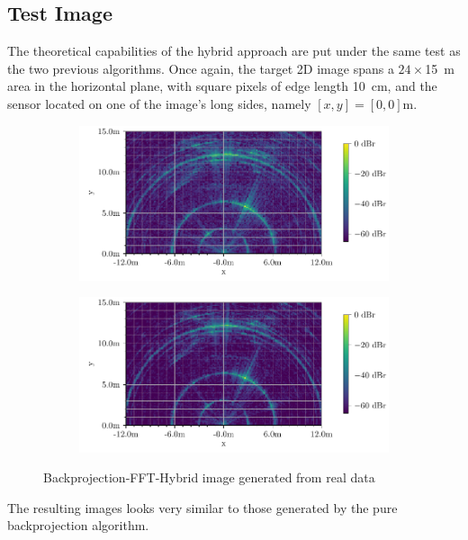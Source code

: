 \subsection{Test Image}
The theoretical capabilities of the hybrid approach are put under the same test as the two previous algorithms.
Once again, the target 2D image spans a $24 \times$\SI{15}{\m} area in the horizontal plane,
with square pixels of edge length \SI{10}{\cm},
and the sensor located on one of the image's long sides, namely $[x,y] = [0,0]$m.

\begin{figure}[t]
    \centering
    \begin{subfigure}{0.8\textwidth}
        \includegraphics[width=\textwidth]{../figures/testimg_uncalibrated_hybrid.pdf}
    \end{subfigure}
    \begin{subfigure}{0.8\textwidth}
        \includegraphics[width=\textwidth]{../figures/testimg_calibrated_hybrid.pdf}
    \end{subfigure}
    \caption{Backprojection-FFT-Hybrid image generated from real data}
    \label{fig:hybrid_testimg}
\end{figure}
The resulting images looks very similar to those generated by the pure backprojection algorithm.

